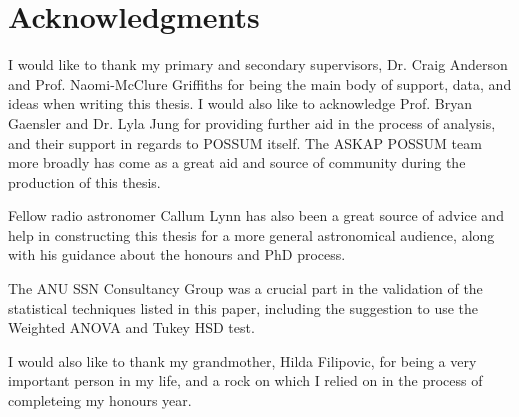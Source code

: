 \chapter*{Acknowledgments}


I would like to thank my primary and secondary supervisors, Dr. Craig Anderson and Prof. Naomi-McClure Griffiths for being the main body of support, data, and ideas when writing this thesis. I would also like to acknowledge Prof. Bryan Gaensler and Dr. Lyla Jung for providing further aid in the process of analysis, and their support in regards to POSSUM itself. The ASKAP POSSUM team more broadly has come as a great aid and source of community during the production of this thesis.

Fellow radio astronomer Callum Lynn has also been a great source of advice and help in constructing this thesis for a more general astronomical audience, along with his guidance about the honours and PhD process.

The ANU SSN Consultancy Group was a crucial part in the validation of the statistical techniques listed in this paper, including the suggestion to use the Weighted ANOVA and Tukey HSD test.

I would also like to thank my grandmother, Hilda Filipovic, for being a very important person in my life, and a rock on which I relied on in the process of completeing my honours year.